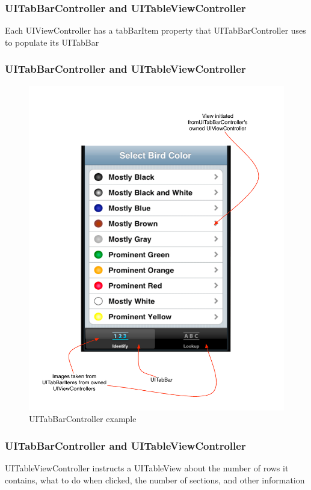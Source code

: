 \documentclass[10pt]{beamer}
\begin{document}
\begin{frame}[fragile]
  \frametitle{UITabBarController and UITableViewController}
  Each UIViewController has a tabBarItem property that UITabBarController uses to populate its UITabBar

\end{frame}

\begin{frame}[fragile]
  \frametitle{UITabBarController and UITableViewController}
  \begin{figure}[htb]
  \begin{center}

  \includegraphics[scale=0.3]{UIViewExample4.pdf}

  \caption{UITabBarController example}
  \end{center}
  \end{figure}

\end{frame}

\begin{frame}[fragile]
  \frametitle{UITabBarController and UITableViewController}
  UITableViewController instructs a UITableView about the number of rows it contains, what to do when clicked, the number of sections, and other information

\end{frame}
\end{document}
